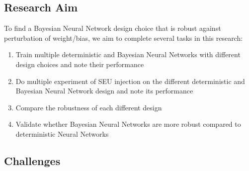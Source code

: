 \documentclass[ %
                    author={Revalda Putawara},
                supervisor={Dr. James Pope},
                    degree={MSc},
                     title={Robustness of Bayesian Neural Networks Design Choices Against Weight and Bias Perturbation Induced by Single Event Upsets (SEUs)},
                      type={},
                      year={2025}]{dissertation}
\begin{document}
\subsection{Research Aim} \label{subsection:researchaim}

To find a Bayesian Neural Network design choice that is robust against perturbation of weight/bias, we aim to complete several tasks in this research:
\begin{enumerate}
\item Train multiple deterministic and Bayesian Neural Networks with different design choices and note their performance
\item Do multiple experiment of SEU injection on the different deterministic and Bayesian Neural Network design and note its performance
\item Compare the robustness of each different design
\item Validate whether Bayesian Neural Networks are more robust compared to deterministic Neural Networks
\end{enumerate}

\subsection{Challenges} %

\end{document}
